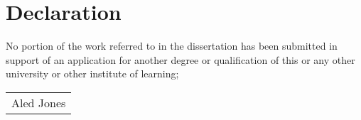 \chapter*{Declaration}
\thispagestyle{empty}
No portion of the work referred to in the dissertation has been submitted in support of an application for another degree or qualification of this or any other university or other institute of learning;
\bigskip
 

\smallskip

\begin{flushright}
    \begin{tabular}{m{5cm}}
        \\ \hline
        \centering Aled Jones \\
    \end{tabular}
\end{flushright}
